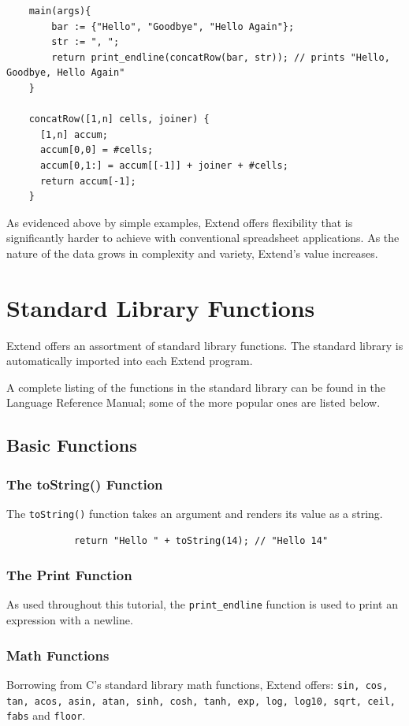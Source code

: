 	\begin{lstlisting}
	main(args){
		bar := {"Hello", "Goodbye", "Hello Again"};
		str := ", ";
		return print_endline(concatRow(bar, str)); // prints "Hello, Goodbye, Hello Again"
	}

	concatRow([1,n] cells, joiner) {
	  [1,n] accum;
	  accum[0,0] = #cells;
	  accum[0,1:] = accum[[-1]] + joiner + #cells;
	  return accum[-1];
	}
	\end{lstlisting}

	\medskip \noindent As evidenced above by simple examples, Extend offers flexibility that is significantly harder to achieve with conventional spreadsheet applications. As the nature of the data grows in complexity and variety, Extend's value increases.

\section{Standard Library Functions}
Extend offers an assortment of standard library functions. The standard library is automatically imported into each Extend program.

\medskip \noindent
A complete listing of the functions in the standard library can be found in the Language Reference Manual; some of the more popular ones are listed below.
	\subsection{Basic Functions}
		\subsubsection{The toString() Function}
		The \texttt{toString()} function takes an argument and renders its value as a string.

		\begin{lstlisting}
			return "Hello " + toString(14); // "Hello 14"
		\end{lstlisting}

		\subsubsection{The Print Function}
		As used throughout this tutorial, the \texttt{print\_endline} function is used to print an expression with a newline.

		\subsubsection{Math Functions}
		Borrowing from C's standard library math functions, Extend offers: \texttt{sin, cos, tan, acos, asin, atan, sinh, cosh, tanh, exp, log, log10, sqrt, ceil, fabs} and \texttt{floor}.

